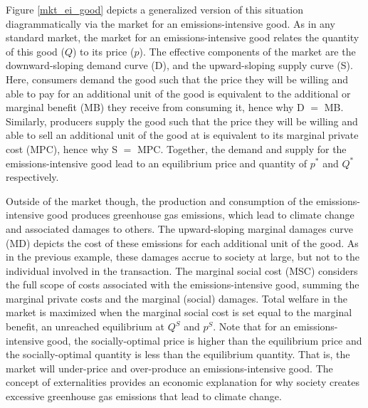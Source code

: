 Figure \ref{mkt_ei_good} depicts a generalized version of this situation diagrammatically via the market for an emissions-intensive good. As in any standard market, the market for an emissions-intensive good relates the quantity of this good ($Q$) to its price ($p$). The effective components of the market are the downward-sloping demand curve (D), and the upward-sloping supply curve (S). Here, consumers demand the good such that the price they will be willing and able to pay for an additional unit of the good is equivalent to the additional or marginal benefit (MB) they receive from consuming it, hence why D $=$ MB. Similarly, producers supply the good such that the price they will be willing and able to sell an additional unit of the good at is equivalent to its marginal private cost (MPC), hence why S $=$ MPC. Together, the demand and supply for the emissions-intensive good lead to an equilibrium price and quantity of $p^*$ and $Q^*$ respectively. 

Outside of the market though, the production and consumption of the emissions-intensive good produces greenhouse gas emissions, which lead to climate change and associated damages to others. The upward-sloping marginal damages curve (MD) depicts the cost of these emissions for each additional unit of the good. As in the previous example, these damages accrue to society at large, but not to the individual involved in the transaction. The marginal social cost (MSC) considers the full scope of costs associated with the emissions-intensive good, summing the marginal private costs and the marginal (social) damages. Total welfare in the market is maximized when the marginal social cost is set equal to the marginal benefit, an unreached equilibrium at $Q^S$ and $p^S$. Note that for an emissions-intensive good, the socially-optimal price is higher than the equilibrium price and the socially-optimal quantity is less than the equilibrium quantity. That is, the market will under-price and over-produce an emissions-intensive good. The concept of externalities provides an economic explanation for why society creates excessive greenhouse gas emissions that lead to climate change. 

